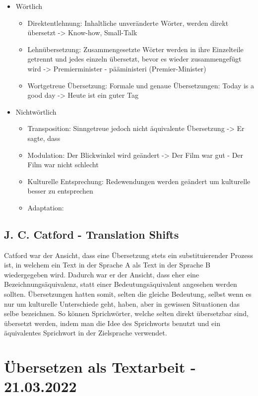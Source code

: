 \documentclass{article}
\begin{document}
	\begin{itemize}
		\item{Wörtlich}
		\begin{itemize}
			\item{Direktentlehnung: Inhaltliche unveränderte Wörter, werden direkt übersetzt -> Know-how, Small-Talk}
			\item{Lehnübersetzung: Zusammengesetzte Wörter werden in ihre Einzelteile getrennt und jedes einzeln übersetzt, bevor es wieder zusammengefügt wird -> Premierminister - pääministeri (Premier-Minister)}
			\item{Wortgetreue Übersetzung: Formale und genaue Übersetzungen: Today is a good day -> Heute ist ein guter Tag}
		\end{itemize}
		\item{Nichtwörtlich}
		\begin{itemize}
			\item{Transposition: Sinngetreue jedoch nicht äquivalente Übersetzung -> Er sagte, dass}
			\item{Modulation: Der Blickwinkel wird geändert -> Der Film war gut - Der Film war nicht schlecht}
			\item{Kulturelle Entsprechung: Redewendungen werden geändert um kulturelle besser zu entsprechen}
			\item{Adaptation: }
		\end{itemize}
	\end{itemize}
	\subsection{J. C. Catford - Translation Shifts}
	Catford war der Ansicht, dass eine Übersetzung stets ein substituierender Prozess ist, in welchem ein Text in der Sprache A als Text in der Sprache B wiedergegeben wird. Dadurch war er der Ansicht, dass eher eine Bezeichnungsäquivalenz, statt einer Bedeutungsäquivalent angesehen werden sollten. Übersetzungen hatten somit, selten die gleiche Bedeutung, selbst wenn es nur um kulturelle Unterschiede geht, haben, aber in gewissen Situationen das selbe bezeichnen. So können Sprichwörter, welche selten direkt übersetzbar sind, übersetzt werden, indem man die Idee des Sprichworts benutzt und ein äquivalentes Sprichwort in der Zielsprache verwendet. \\

	\section{Übersetzen als Textarbeit - 21.03.2022}
\end{document}
